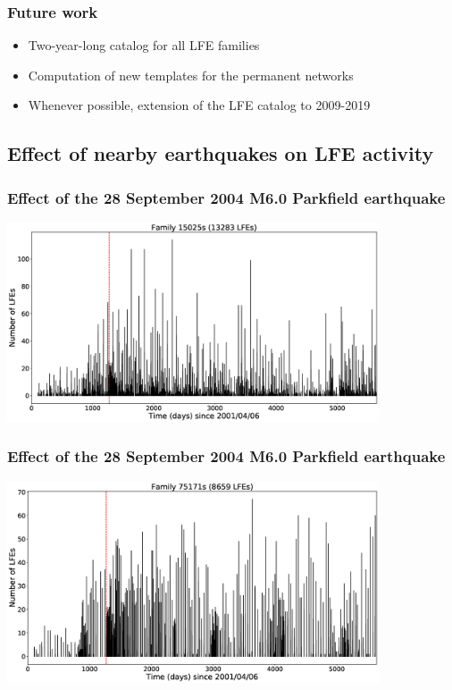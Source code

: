 \documentclass{beamer}
\begin{document}
	\begin{frame}
		\frametitle{Future work}
		\begin{itemize}
			\item Two-year-long catalog for all LFE families
			\item Computation of new templates for the permanent networks
			\item Whenever possible, extension of the LFE catalog to 2009-2019
		\end{itemize}
	\end{frame}


	\subsection{Effect of nearby earthquakes on LFE activity}

	\begin{frame}
		\frametitle{Effect of the 28 September 2004 M6.0 Parkfield earthquake}
		\begin{center}
			\includegraphics[width=11cm, trim={0cm 0cm 0cm 0cm}, clip]{LFE_catalogs/15025s_Parkfield.eps}
		\end{center}
	\end{frame}

	\begin{frame}
		\frametitle{Effect of the 28 September 2004 M6.0 Parkfield earthquake}
		\begin{center}
			\includegraphics[width=11cm, trim={0cm 0cm 0cm 0cm}, clip]{LFE_catalogs/75171s_Parkfield.eps}
		\end{center}
	\end{frame}
\end{document}
